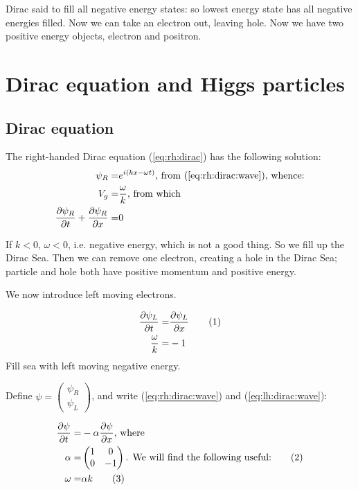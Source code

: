 \documentclass[]{article}
\newcommand\numberthis{\addtocounter{equation}{1}\tag{\theequation}}
\begin{document}
Dirac said to fill all negative energy states: so lowest energy state has all negative energies filled. Now we can take an electron out, leaving hole. Now we have two positive energy objects, electron and positron.

\section{Dirac equation and Higgs particles}

\subsection{Dirac equation}

The right-handed Dirac equation (\ref{eq:rh:dirac}) has the following solution:
\begin{align*}
\psi_R =& e^{i(kx-\omega t)} \text{, from (\ref{eq:rh:dirac:wave}), whence:}\\
V_g =& \frac{\omega}{k} \text{, from which}\\
\frac{\partial \psi_R}{\partial t} + \frac{\partial \psi_R}{\partial x} =&0
\end{align*}

If $k<0$, $\omega<0$, i.e. negative energy, which is not a good thing. So we fill up the Dirac Sea. Then we can remove one electron, creating a hole in the Dirac Sea; particle and hole both have positive momentum and positive energy.

We now introduce left moving electrons.

\begin{align*}
\frac{\partial \psi_L}{\partial t} =& \frac{\partial \psi_L}{\partial x} \numberthis \label{eq:lh:dirac:wave}\\
\frac{\omega}{k} =& -1
\end{align*}
Fill sea with left moving negative energy.

Define $\psi=\begin{pmatrix}
	\psi_R\\
	\psi_L
\end{pmatrix}$, and write (\ref{eq:rh:dirac:wave}) and (\ref{eq:lh:dirac:wave}):

\begin{align*}
	\frac{\partial \psi}{\partial t} =& - \alpha \frac{\partial \psi}{\partial x} \text{, where}\\
	\alpha =& \begin{pmatrix}
		1&0\\
		0&-1
	\end{pmatrix} \text{. We will find the following useful:} \numberthis\label{eq:alpha}\\
	\omega =& \alpha k \numberthis \label{eq:dirac:1}
\end{align*}
\end{document}
